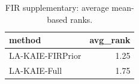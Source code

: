 \begin{table}[t]
\centering
\scriptsize
\caption{FIR supplementary: average mean-based ranks.}
\label{tab:fir_supplementary_ranks}
\begin{tabular}{lr}
\toprule
method & avg\_rank \\
\midrule
LA-KAIE-FIRPrior & 1.25 \\
LA-KAIE-Full & 1.75 \\
\bottomrule
\end{tabular}
\end{table}
